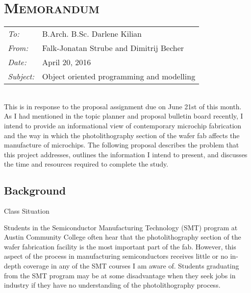 
\renewcommand{\workingdir}{../../}

%

\DNotiz{}
\renewcommand{\Dokumentensignatur}{}




\chapter*{\textsc{Memorandum}}
\begin{tabular}{l l}
\emph{To:} & B.Arch. B.Sc. Darlene Kilian\\
\emph{From:} & Falk-Jonatan Strube and Dimitrij Becher\\
\emph{Date:} & April 20, 2016\\
\emph{Subject:} & Object oriented programming and modelling\\
\end{tabular}\medskip\\
This is in response to the proposal assignment due on June 21st of this month. As I had mentioned in the topic planner and proposal bulletin board recently, I intend to provide an informational view of contemporary microchip fabrication and the way in which the photolithography section of the wafer fab affects the manufacture of microchips. The following proposal describes the problem that this project addresses, outlines the information I intend to present, and discusses the time and resources required to complete the study.
\section*{Background}
Class Situation

Students in the Semiconductor Manufacturing Technology (SMT) program at Austin Community College often hear that the photolithography section of the wafer fabrication facility is the most important part of the fab. However, this aspect of the process in manufacturing semiconductors receives little or no in-depth coverage in any of the SMT courses I am aware of. Students graduating from the SMT program may be at some disadvantage when they seek jobs in industry if they have no understanding of the photolithography process.
